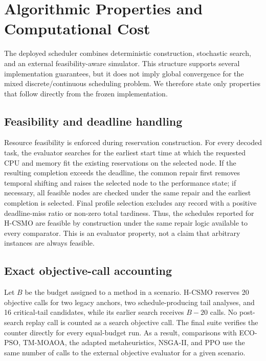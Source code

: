 \documentclass[preprint,12pt]{elsarticle}
\newcommand{\method}{H-CSMO\xspace}
\begin{document}
\section{Algorithmic Properties and Computational Cost}
\label{sec:properties}

The deployed scheduler combines deterministic construction, stochastic search, and an external feasibility-aware simulator. This structure supports several implementation guarantees, but it does not imply global convergence for the mixed discrete/continuous scheduling problem. We therefore state only properties that follow directly from the frozen implementation.

\subsection{Feasibility and deadline handling}

Resource feasibility is enforced during reservation construction. For every decoded task, the evaluator searches for the earliest start time at which the requested CPU and memory fit the existing reservations on the selected node. If the resulting completion exceeds the deadline, the common repair first removes temporal shifting and raises the selected node to the performance state; if necessary, all feasible nodes are checked under the same repair and the earliest completion is selected. Final profile selection excludes any record with a positive deadline-miss ratio or non-zero total tardiness. Thus, the schedules reported for \method are feasible by construction under the same repair logic available to every comparator. This is an evaluator property, not a claim that arbitrary instances are always feasible.

\subsection{Exact objective-call accounting}

Let $B$ be the budget assigned to a method in a scenario. \method reserves 20 objective calls for two legacy anchors, two schedule-producing tail analyses, and 16 critical-tail candidates, while its earlier search receives $B-20$ calls. No post-search replay call is counted as a search objective call. The final suite verifies the counter directly for every equal-budget run. As a result, comparisons with ECO-PSO, TM-MOAOA, the adapted metaheuristics, NSGA-II, and PPO use the same number of calls to the external objective evaluator for a given scenario.
\end{document}
